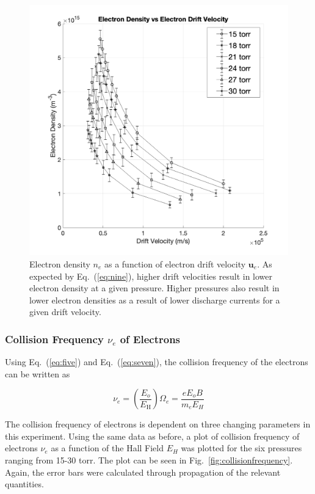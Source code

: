\documentclass[%
 aip,
rsi,%
 amsmath,amssymb,
 reprint,%
author-numerical,%
]{revtex4-1}
\begin{document}
\begin{figure}
\includegraphics[width=1\linewidth]{lateximages/electrondensity.png} 
\caption{\label{fig:electrondensity} Electron density $n_{e}$ as a function of electron drift velocity $\boldsymbol { u } _ { e }$. As expected by Eq.~(\ref{eq:nine}), higher drift velocities result in lower electron density at a given pressure. Higher pressures also result in lower electron densities as a result of lower discharge currents for a given drift velocity. }
\end{figure}




\subsubsection{Collision Frequency $\nu _ { e }$ of Electrons}
Using Eq.~(\ref{eq:five}) and Eq.~(\ref{eq:seven}), the collision frequency of the electrons can be written as 

\begin{equation}
\nu _ { e } = \left( \frac {  { E } _ { o } } {  { E } _ { \mathrm { H } } } \right) \Omega _ { e }= \frac{e E  _ { o }B}{m_{e}E  _ { H }}
\label{eq:ten}
\end{equation}

The collision frequency of electrons is dependent on three changing parameters in this experiment. Using the same data as before, a plot of collision frequency of electrons $\nu _ { e }$ as a function of the Hall Field ${E}  _ { H }$ was plotted for the six pressures ranging from 15-30 torr. The plot can be seen in Fig.~\ref{fig:collisionfrequency}. Again, the error bars were calculated through propagation of the relevant quantities.
\end{document}
